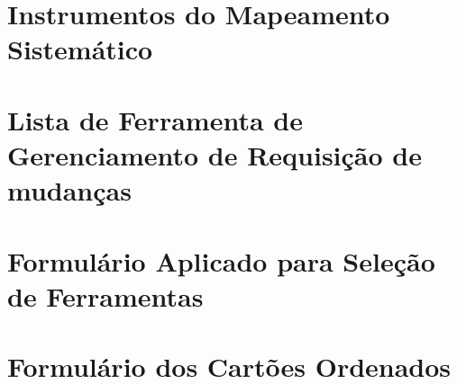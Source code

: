 \begin{appendices}
	\chapter{Instrumentos do Mapeamento Sistemático}
	 \label{ch:app-instrumentos-mapeamento}
	 
	 \chapter{Lista de Ferramenta de Gerenciamento de Requisição de mudanças}
	 \label{ch:app-lista-fgrm}
	 
	 \chapter{Formulário Aplicado para Seleção de Ferramentas}
	 \label{ch:app-form-selecao-ferramentas}
	 
	 \chapter{Formulário dos Cartões Ordenados}
	 \label{ch:app-form-cartoes-ordenados}
	 


\end{appendices}